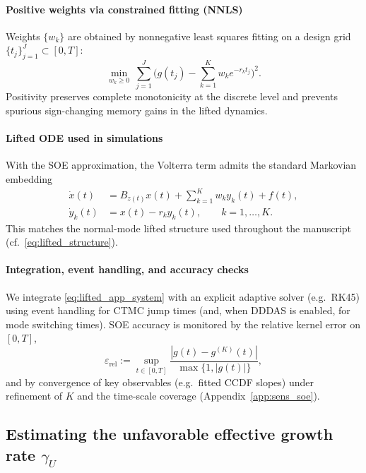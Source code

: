 \documentclass[12pt,a4paper]{article}
\theoremstyle{definition}
\theoremstyle{remark}
\begin{document}
\paragraph{Positive weights via constrained fitting (NNLS)}
Weights $\{w_k\}$ are obtained by nonnegative least squares fitting on a design grid $\{t_j\}_{j=1}^J\subset[0,T]$:
\begin{equation}\label{eq:nnls_app}
	\min_{w_k\ge 0}\ \sum_{j=1}^J\Big(g(t_j)-\sum_{k=1}^K w_k e^{-r_k t_j}\Big)^2.
\end{equation}
Positivity preserves complete monotonicity at the discrete level and prevents spurious sign-changing memory gains in the lifted dynamics.

\paragraph{Lifted ODE used in simulations}
With the SOE approximation, the Volterra term admits the standard Markovian embedding
\begin{align}\label{eq:lifted_app_system}
	\dot{x}(t) &= B_{z(t)}x(t)+\sum_{k=1}^K w_k y_k(t)+f(t),\\
	\dot{y}_k(t) &= x(t)-r_k y_k(t),\qquad k=1,\dots,K.
\end{align}
This matches the normal-mode lifted structure used throughout the manuscript (cf.\ \eqref{eq:lifted_structure}).

\paragraph{Integration, event handling, and accuracy checks}
We integrate \eqref{eq:lifted_app_system} with an explicit adaptive solver (e.g.\ RK45) using event handling for CTMC jump times
(and, when DDDAS is enabled, for mode switching times). SOE accuracy is monitored by the relative kernel error on $[0,T]$,
\begin{equation}\label{eq:soe_error_metric}
	\varepsilon_{\mathrm{rel}}
	:=
	\sup_{t\in[0,T]}\frac{|g(t)-g^{(K)}(t)|}{\max\{1,|g(t)|\}},
\end{equation}
and by convergence of key observables (e.g.\ fitted CCDF slopes) under refinement of $K$ and the time-scale coverage
(Appendix~\ref{app:sens_soe}).

\subsection{Estimating the unfavorable effective growth rate $\gamma_U$}
\label{app:gamma_estimation}
\end{document}

